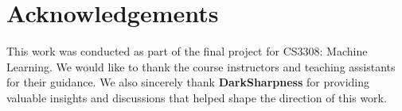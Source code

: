 \documentclass{article}
\begin{document}
\section*{Acknowledgements}

This work was conducted as part of the final project for CS3308: Machine Learning. We would like to thank the course instructors and teaching assistants for their guidance. We also sincerely thank \textbf{DarkSharpness} for providing valuable insights and discussions that helped shape the direction of this work.


\medskip










\end{document}
